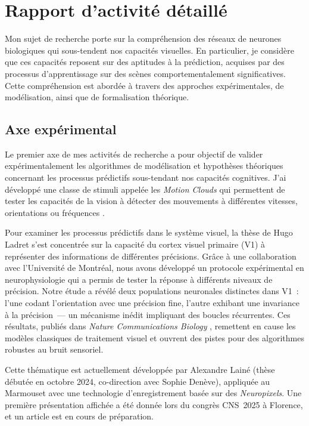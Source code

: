 \documentclass[11pt,french,a4paper,oneside]{article}
\begin{document}
\section{Rapport d'activité détaillé}

Mon sujet de recherche porte sur la compréhension des réseaux de neurones biologiques qui sous-tendent nos capacités visuelles. En particulier, je considère que ces capacités reposent sur des aptitudes à la prédiction, acquises par des processus d'apprentissage sur des scènes comportementalement significatives. Cette compréhension est abordée à travers des approches expérimentales, de modélisation, ainsi que de formalisation théorique.

\subsection{Axe expérimental}

Le premier axe de mes activités de recherche a pour objectif de valider expérimentalement les algorithmes de modélisation et hypothèses théoriques concernant les processus prédictifs sous-tendant nos capacités cognitives. J'ai développé une classe de stimuli appelée les \emph{Motion Clouds} qui permettent de tester les capacités de la vision à détecter des mouvements à différentes vitesses, orientations ou fréquences \citep*{SanzLeon12}.

Pour examiner les processus prédictifs dans le système visuel, la thèse de Hugo Ladret s'est concentrée sur la capacité du cortex visuel primaire (V1) à représenter des informations de différentes précisions. Grâce à une collaboration avec l'Université de Montréal, nous avons développé un protocole expérimental en neurophysiologie qui a permis de tester la réponse à différents niveaux de précision. Notre étude a révélé deux populations neuronales distinctes dans V1~: l'une codant l'orientation avec une précision fine, l'autre exhibant une invariance à la précision~--- un mécanisme inédit impliquant des boucles récurrentes. Ces résultats, publiés dans \emph{Nature Communications Biology} \citep*{Ladret23}, remettent en cause les modèles classiques de traitement visuel et ouvrent des pistes pour des algorithmes robustes au bruit sensoriel.

Cette thématique est actuellement développée par Alexandre Lainé (thèse débutée en octobre 2024, co-direction avec Sophie Denève), appliquée au Marmouset avec une technologie d'enregistrement basée sur des \emph{Neuropixels}. Une première présentation affichée a été donnée lors du congrès CNS~2025 à Florence, et un article est en cours de préparation.
\end{document}
